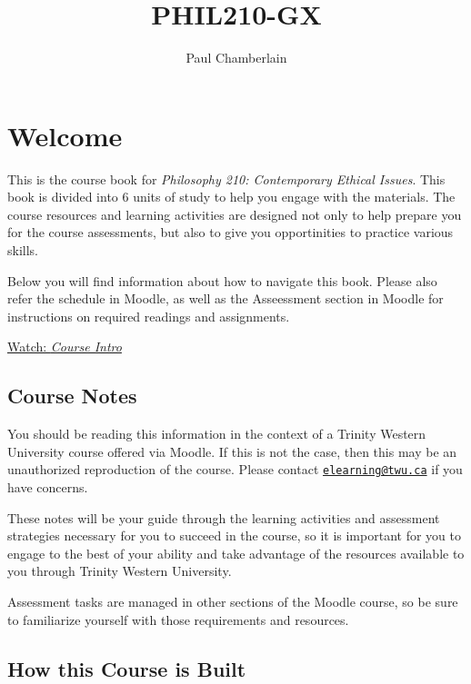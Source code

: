 \documentclass[
]{book}
\title{PHIL210-GX}
\author{Paul Chamberlain}
\date{}
\begin{document}
\maketitle

{
\setcounter{tocdepth}{1}
\tableofcontents
}
\hypertarget{welcome}{%
\chapter*{Welcome}\label{welcome}}

This is the course book for \emph{Philosophy 210: Contemporary Ethical Issues}. This book is divided into 6 units of study to help you engage with the materials. The course resources and learning activities are designed not only to help prepare you for the course assessments, but also to give you opportinities to practice various skills.

Below you will find information about how to navigate this book. Please also refer the schedule in Moodle, as well as the Asseessment section in Moodle for instructions on required readings and assignments.

\href{https://vimeo.com/861410545/4fe37f1488}{Watch: \emph{Course Intro}}

\hypertarget{course-notes}{%
\section*{Course Notes}\label{course-notes}}

You should be reading this information in the context of a Trinity Western University course offered via Moodle. If this is not the case, then this may be an unauthorized reproduction of the course. Please contact \href{mailto:elearning@twu.ca}{\nolinkurl{elearning@twu.ca}} if you have concerns.

These notes will be your guide through the learning activities and assessment strategies necessary for you to succeed in the course, so it is important for you to engage to the best of your ability and take advantage of the resources available to you through Trinity Western University.

Assessment tasks are managed in other sections of the Moodle course, so be sure to familiarize yourself with those requirements and resources.

\hypertarget{how-this-course-is-built}{%
\section*{How this Course is Built}\label{how-this-course-is-built}}
\end{document}
